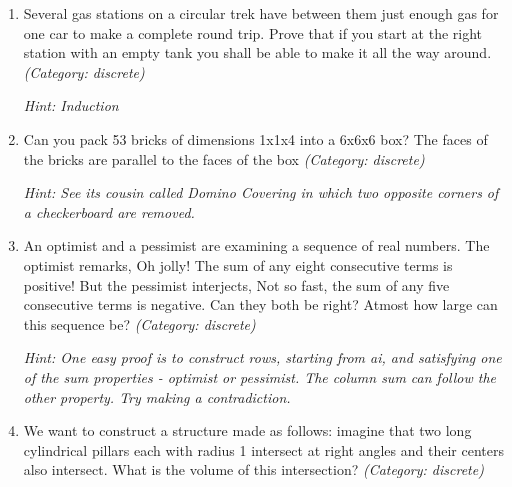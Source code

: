 \begin{enumerate}

\item Several gas stations on a circular trek have between them just enough gas for one car to make a complete round trip. Prove that if you start at the right station with an empty tank you shall be able to make it all the way around.
\small\emph{(Category: discrete)}

\small\emph{Hint: Induction}





\item Can you pack 53 bricks of dimensions 1x1x4 into a 6x6x6 box? The faces of the bricks are parallel to the faces of the box
\small\emph{(Category: discrete)}

\small\emph{Hint: See its cousin called Domino Covering in which two opposite corners of a checkerboard are removed.}





\item An optimist and a pessimist are examining a sequence of real numbers. The optimist remarks, Oh jolly! The sum of any eight consecutive terms is positive! But the pessimist interjects, Not so fast, the sum of any five consecutive terms is negative. Can they both be right? Atmost how large can this sequence be?
\small\emph{(Category: discrete)}

\small\emph{Hint: One easy proof is to construct rows, starting from ai, and satisfying one of the sum properties - optimist or pessimist. The column sum can follow the other property. Try making a contradiction.}





\item We want to construct a structure made as follows: imagine that two long cylindrical pillars each with radius 1 intersect at right angles and their centers also intersect. What is the volume of this intersection?
\small\emph{(Category: discrete)}




\end{enumerate}
